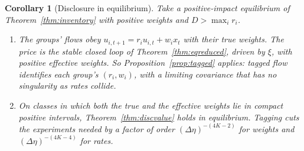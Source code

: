 \documentclass[12pt]{article}
\newtheorem{corollary}[theorem]{Corollary}
\theoremstyle{definition}
\theoremstyle{remark}
\begin{document}
\begin{corollary}[Disclosure in equilibrium]\label{cor:eqdisclosure}
Take a positive-impact equilibrium of Theorem~\ref{thm:inventory} with positive weights and $D>\max_ir_i$.
\begin{enumerate}[label=(\roman*),itemsep=1pt]
\item The groups' flows obey $u_{i,t+1}=r_iu_{i,t}+w_ix_t$ with their \emph{true} weights. The price is the stable closed loop of Theorem~\ref{thm:eqreduced}, driven by $\xi$, with positive effective weights. So Proposition~\ref{prop:tagged} applies: tagged flow identifies each group's $(r_i,w_i)$, with a limiting covariance that has no singularity as rates collide.
\item On classes in which both the true and the effective weights lie in compact positive intervals, Theorem~\ref{thm:discvalue} holds in equilibrium. Tagging cuts the experiments needed by a factor of order $(\Delta\eta)^{-(4K-2)}$ for weights and $(\Delta\eta)^{-(4K-4)}$ for rates.
\end{enumerate}
\end{corollary}
\end{document}
